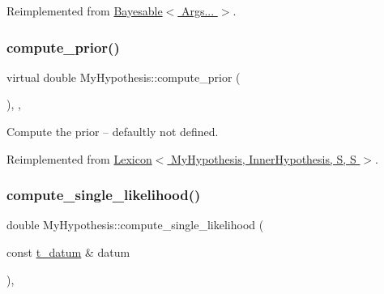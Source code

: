 Reimplemented from \hyperlink{class_bayesable_af9547335ae15a5068b10d29aee5056ae}{Bayesable$<$ Args... $>$}.

\mbox{\label{class_my_hypothesis_ab092094c5fc31730de4f40609220bb18}} 
\subsubsection{\texorpdfstring{compute\+\_\+prior()}{compute\_prior()}}
{\footnotesize\ttfamily virtual double My\+Hypothesis\+::compute\+\_\+prior (\begin{DoxyParamCaption}{ }\end{DoxyParamCaption})\hspace{0.3cm}{\ttfamily [inline]}, {\ttfamily [override]}, {\ttfamily [virtual]}}



Compute the prior -- defaultly not defined. 



Reimplemented from \hyperlink{class_lexicon_a1edc72e7c3b422d1c13b6cc3eb33d08d}{Lexicon$<$ My\+Hypothesis, Inner\+Hypothesis, S, S $>$}.

\mbox{\label{class_my_hypothesis_a5e6bd5e0ebcb987aa4f0adf4295dba11}} 
\subsubsection{\texorpdfstring{compute\+\_\+single\+\_\+likelihood()}{compute\_single\_likelihood()}\hspace{0.1cm}{\footnotesize\ttfamily [1/2]}}
{\footnotesize\ttfamily double My\+Hypothesis\+::compute\+\_\+single\+\_\+likelihood (\begin{DoxyParamCaption}\item[{const \hyperlink{class_bayesable_a7c93a2eeab708378eb321745908718d4}{t\+\_\+datum} \&}]{datum }\end{DoxyParamCaption})\hspace{0.3cm}{\ttfamily [inline]}, {\ttfamily [virtual]}}



